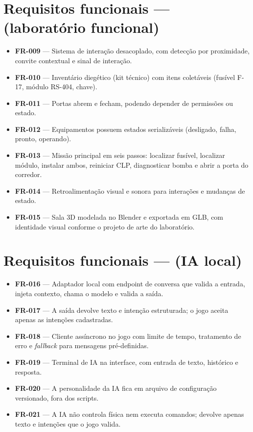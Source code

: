 \section*{Requisitos funcionais ---  (laboratório funcional)}
\label{ap:fr2}
\begin{itemize}
  \item \textbf{FR-009} --- Sistema de interação desacoplado, com detecção por
  proximidade, convite contextual e sinal de interação.
  \item \textbf{FR-010} --- Inventário diegético (kit técnico) com itens
  coletáveis (fusível F-17, módulo RS-404, chave).
  \item \textbf{FR-011} --- Portas abrem e fecham, podendo depender de
  permissões ou estado.
  \item \textbf{FR-012} --- Equipamentos possuem estados serializáveis
  (desligado, falha, pronto, operando).
  \item \textbf{FR-013} --- Missão principal em seis passos: localizar
  fusível, localizar módulo, instalar ambos, reiniciar CLP, diagnosticar bomba
  e abrir a porta do corredor.
  \item \textbf{FR-014} --- Retroalimentação visual e sonora para interações e
  mudanças de estado.
  \item \textbf{FR-015} --- Sala 3D modelada no Blender e exportada em GLB,
  com identidade visual conforme o projeto de arte do laboratório.
\end{itemize}

\section*{Requisitos funcionais ---  (IA local)}
\label{ap:fr3}
\begin{itemize}
  \item \textbf{FR-016} --- Adaptador local com endpoint de conversa que
  valida a entrada, injeta contexto, chama o modelo e valida a saída.
  \item \textbf{FR-017} --- A saída devolve texto e intenção estruturada; o
  jogo aceita apenas as intenções cadastradas.
  \item \textbf{FR-018} --- Cliente assíncrono no jogo com limite de tempo,
  tratamento de erro e \emph{fallback} para mensagens pré-definidas.
  \item \textbf{FR-019} --- Terminal de IA na interface, com entrada de texto,
  histórico e resposta.
  \item \textbf{FR-020} --- A personalidade da IA fica em arquivo de
  configuração versionado, fora dos scripts.
  \item \textbf{FR-021} --- A IA não controla física nem executa comandos;
  devolve apenas texto e intenções que o jogo valida.
\end{itemize}

